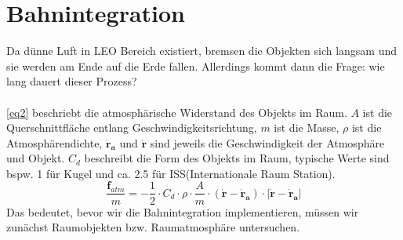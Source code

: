 \documentclass{article}
\begin{document}
\section{Bahnintegration}
Da dünne Luft in LEO Bereich existiert, bremsen die Objekten sich langsam und sie werden am Ende auf die Erde fallen. Allerdings kommt dann die Frage: wie lang dauert dieser Prozess?
\\\\
\autoref{eq2} beschriebt die atmosphärische Widerstand des Objekts im Raum. $A$ ist die Querschnittfläche entlang Geschwindigkeitsrichtung, $m$ ist die Masse, $\rho$ ist die Atmosphärendichte, $\bm{\dot{r}_a}$ und $\bm{\dot{r}}$ sind jeweils die Geschwindigkeit der Atmosphäre und Objekt. $C_d$ beschreibt die Form des Objekts im Raum, typische Werte sind bspw. 1 für Kugel und ca. 2.5 für ISS(Internationale Raum Station).
\begin{equation}\label{eq2}
	\frac{\bm{f}_{atm}}{m} = -\frac{1}{2} \cdot C_d \cdot \rho \cdot \frac{A}{m} \cdot \left(\bm{\dot{r}} - \bm{\dot{r}_a}\right) \cdot |\bm{\dot{r}} - \bm{\dot{r}_a}|
\end{equation}
Das bedeutet, bevor wir die Bahnintegration implementieren, müssen wir zunächst Raumobjekten bzw. Raumatmosphäre untersuchen.
\end{document}

